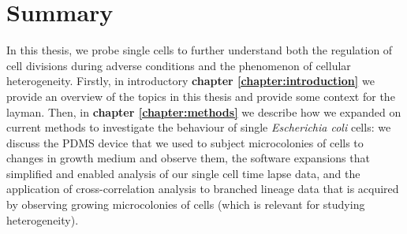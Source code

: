 

\chapter*{Summary}


In this thesis, we probe single cells to 
further understand both
the regulation of cell divisions during adverse conditions
and the phenomenon of cellular heterogeneity.
%
Firstly, in introductory \textbf{chapter \ref{chapter:introduction}} we 
provide an overview of the topics in this thesis and provide some context for the layman.
%
Then, in \textbf{chapter \ref{chapter:methods}} we describe how we expanded on current methods to investigate the behaviour of single \textit{Escherichia coli} cells: 
%
we discuss the PDMS device that we used to subject microcolonies of cells to changes in growth medium and observe them,
the software expansions that simplified and enabled analysis of our single cell time lapse data, and 
the application of cross-correlation analysis to branched lineage data that is acquired by observing growing microcolonies of cells (which is relevant for studying heterogeneity).

